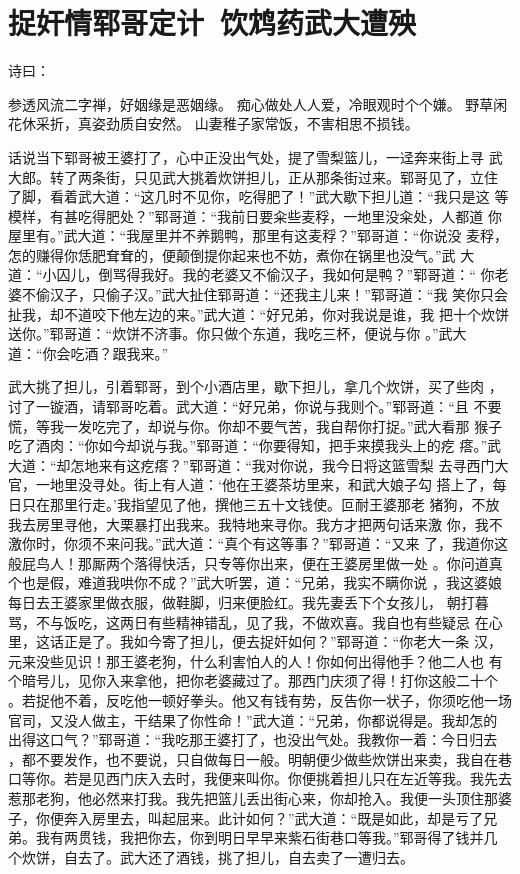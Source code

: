 \chapter{捉奸情郓哥定计~饮鸩药武大遭殃}

诗曰：

参透风流二字禅，好姻缘是恶姻缘。
痴心做处人人爱，冷眼观时个个嫌。
野草闲花休采折，真姿劲质自安然。
山妻稚子家常饭，不害相思不损钱。

话说当下郓哥被王婆打了，心中正没出气处，提了雪梨篮儿，一迳奔来街上寻
武大郎。转了两条街，只见武大挑着炊饼担儿，正从那条街过来。郓哥见了，立住
了脚，看着武大道：“这几时不见你，吃得肥了！”武大歇下担儿道：“我只是这
等模样，有甚吃得肥处？”郓哥道：“我前日要籴些麦稃，一地里没籴处，人都道
你屋里有。”武大道：“我屋里并不养鹅鸭，那里有这麦稃？”郓哥道：“你说没
麦稃，怎的赚得你恁肥耷耷的，便颠倒提你起来也不妨，煮你在锅里也没气。”武
大道：“小囚儿，倒骂得我好。我的老婆又不偷汉子，我如何是鸭？”郓哥道：“
你老婆不偷汉子，只偷子汉。”武大扯住郓哥道：“还我主儿来！”郓哥道：“我
笑你只会扯我，却不道咬下他左边的来。”武大道：“好兄弟，你对我说是谁，我
把十个炊饼送你。”郓哥道：“炊饼不济事。你只做个东道，我吃三杯，便说与你
。”武大道：“你会吃酒？跟我来。”

武大挑了担儿，引着郓哥，到个小酒店里，歇下担儿，拿几个炊饼，买了些肉
，讨了一镟酒，请郓哥吃着。武大道：“好兄弟，你说与我则个。”郓哥道：“且
不要慌，等我一发吃完了，却说与你。你却不要气苦，我自帮你打捉。”武大看那
猴子吃了酒肉：“你如今却说与我。”郓哥道：“你要得知，把手来摸我头上的疙
瘩。”武大道：“却怎地来有这疙瘩？”郓哥道：“我对你说，我今日将这篮雪梨
去寻西门大官，一地里没寻处。街上有人道：‘他在王婆茶坊里来，和武大娘子勾
搭上了，每日只在那里行走。’我指望见了他，撰他三五十文钱使。叵耐王婆那老
猪狗，不放我去房里寻他，大栗暴打出我来。我特地来寻你。我方才把两句话来激
你，我不激你时，你须不来问我。”武大道：“真个有这等事？”郓哥道：“又来
了，我道你这般屁鸟人！那厮两个落得快活，只专等你出来，便在王婆房里做一处
。你问道真个也是假，难道我哄你不成？”武大听罢，道：“兄弟，我实不瞒你说
，我这婆娘每日去王婆家里做衣服，做鞋脚，归来便脸红。我先妻丢下个女孩儿，
朝打暮骂，不与饭吃，这两日有些精神错乱，见了我，不做欢喜。我自也有些疑忌
在心里，这话正是了。我如今寄了担儿，便去捉奸如何？”郓哥道：“你老大一条
汉，元来没些见识！那王婆老狗，什么利害怕人的人！你如何出得他手？他二人也
有个暗号儿，见你入来拿他，把你老婆藏过了。那西门庆须了得！打你这般二十个
。若捉他不着，反吃他一顿好拳头。他又有钱有势，反告你一状子，你须吃他一场
官司，又没人做主，干结果了你性命！”武大道：“兄弟，你都说得是。我却怎的
出得这口气？”郓哥道：“我吃那王婆打了，也没出气处。我教你一着：今日归去
，都不要发作，也不要说，只自做每日一般。明朝便少做些炊饼出来卖，我自在巷
口等你。若是见西门庆入去时，我便来叫你。你便挑着担儿只在左近等我。我先去
惹那老狗，他必然来打我。我先把篮儿丢出街心来，你却抢入。我便一头顶住那婆
子，你便奔入房里去，叫起屈来。此计如何？”武大道：“既是如此，却是亏了兄
弟。我有两贯钱，我把你去，你到明日早早来紫石街巷口等我。”郓哥得了钱并几
个炊饼，自去了。武大还了酒钱，挑了担儿，自去卖了一遭归去。

